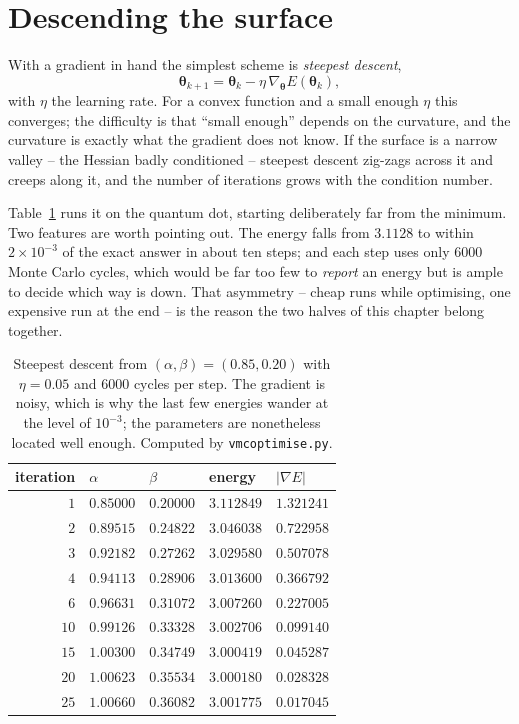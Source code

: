 \section{Descending the surface}
\label{sec:optdescent}

With a gradient in hand the simplest scheme is \emph{steepest descent},
\begin{equation}
  \bm{\theta}_{k+1} = \bm{\theta}_k
   - \eta\,\nabla_{\bm{\theta}}E(\bm{\theta}_k) ,
  \label{eq:14-steepestdescent}
\end{equation}
with $\eta$ the learning rate.  For a convex function and a small enough
$\eta$ this converges; the difficulty is that ``small enough'' depends on the
curvature, and the curvature is exactly what the gradient does not know.  If
the surface is a narrow valley -- the Hessian badly conditioned -- steepest
descent zig-zags across it and creeps along it, and the number of iterations
grows with the condition number.

Table~\ref{tab:14-descent} runs it on the quantum dot, starting deliberately
far from the minimum.  Two features are worth pointing out.  The energy falls
from $3.1128$ to within $2\times10^{-3}$ of the exact answer in about ten
steps; and each step uses only $6000$ Monte Carlo cycles, which would be far
too few to \emph{report} an energy but is ample to decide which way is down.
That asymmetry -- cheap runs while optimising, one expensive run at the end --
is the reason the two halves of this chapter belong together.

\begin{table}[h]
\centering
\renewcommand{\arraystretch}{1.2}
\setlength{\tabcolsep}{13pt}
\begin{tabular}{rllll}
\toprule
iteration & $\alpha$ & $\beta$ & energy & $|\nabla E|$\\
\midrule
$1$  & $0.85000$ & $0.20000$ & $3.112849$ & $1.321241$\\
$2$  & $0.89515$ & $0.24822$ & $3.046038$ & $0.722958$\\
$3$  & $0.92182$ & $0.27262$ & $3.029580$ & $0.507078$\\
$4$  & $0.94113$ & $0.28906$ & $3.013600$ & $0.366792$\\
$6$  & $0.96631$ & $0.31072$ & $3.007260$ & $0.227005$\\
$10$ & $0.99126$ & $0.33328$ & $3.002706$ & $0.099140$\\
$15$ & $1.00300$ & $0.34749$ & $3.000419$ & $0.045287$\\
$20$ & $1.00623$ & $0.35534$ & $3.000180$ & $0.028328$\\
$25$ & $1.00660$ & $0.36082$ & $3.001775$ & $0.017045$\\
\bottomrule
\end{tabular}
\caption{Steepest descent from $(\alpha,\beta)=(0.85,0.20)$ with
$\eta=0.05$ and $6000$ cycles per step.  The gradient is noisy, which is why
the last few energies wander at the level of $10^{-3}$; the parameters are
nonetheless located well enough.  Computed by \texttt{vmcoptimise.py}.}
\label{tab:14-descent}
\end{table}

